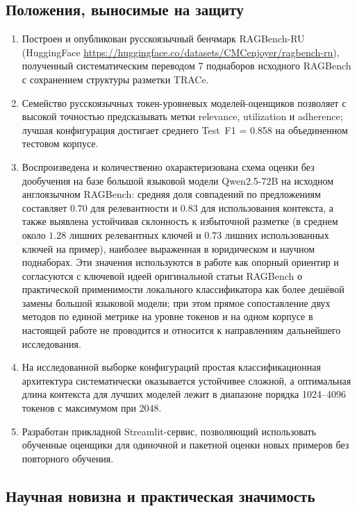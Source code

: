 \subsection*{Положения, выносимые на защиту}

\begin{enumerate}
  \item Построен и опубликован русскоязычный бенчмарк RAGBench-RU
  (HuggingFace \url{https://huggingface.co/datasets/CMCenjoyer/ragbench-ru}),
  полученный систематическим переводом 7 поднаборов исходного RAGBench с сохранением
  структуры разметки TRACe.
  \item Семейство русскоязычных токен-уровневых моделей-оценщиков позволяет с высокой
  точностью предсказывать метки relevance, utilization и adherence; лучшая конфигурация
  достигает среднего Test~F1 = 0.858 на объединенном тестовом корпусе.
  \item Воспроизведена и количественно охарактеризована схема оценки без
  дообучения на базе большой языковой модели Qwen2.5-72B на исходном
  англоязычном RAGBench: средняя доля совпадений по предложениям составляет
  $0.70$ для релевантности и $0.83$ для использования контекста, а также
  выявлена устойчивая склонность к избыточной разметке (в среднем около
  $1.28$ лишних релевантных ключей и $0.73$ лишних использованных ключей на
  пример), наиболее выраженная в юридическом и научном поднаборах. Эти
  значения используются в работе как опорный ориентир и согласуются с
  ключевой идеей оригинальной статьи RAGBench о практической применимости
  локального классификатора как более дешёвой замены большой языковой модели;
  при этом прямое сопоставление двух методов по единой метрике на уровне
  токенов и на одном корпусе в настоящей работе не проводится и относится к
  направлениям дальнейшего исследования.
  \item На исследованной выборке конфигураций простая классификационная архитектура
  систематически оказывается устойчивее сложной, а оптимальная длина контекста для
  лучших моделей лежит в диапазоне порядка 1024--4096 токенов с максимумом при 2048.
  \item Разработан прикладной Streamlit-сервис, позволяющий использовать обученные
  оценщики для одиночной и пакетной оценки новых примеров без повторного обучения.
\end{enumerate}

\subsection*{Научная новизна и практическая значимость}

